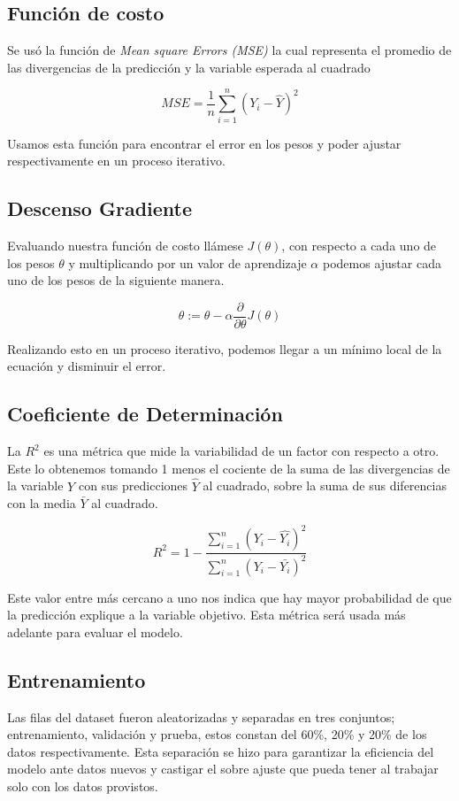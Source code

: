 \documentclass[twocolumn]{article}
\begin{document}
\subsection{Función de costo}
Se usó la función de \textit{Mean square Errors (MSE)} la cual representa el promedio
de las divergencias de la predicción y la variable esperada al cuadrado

\begin{equation}
  MSE = \frac{1}{n}\sum_{i = 1}^n (Y_i - \hat{Y})^2
\end{equation}

Usamos esta función para encontrar el error en los pesos y poder ajustar respectivamente
en un proceso iterativo.

\subsection{Descenso Gradiente}
Evaluando nuestra función de costo llámese \(J(\theta)\), con respecto a cada uno 
de los pesos \(\theta\) y multiplicando por un valor de aprendizaje \(\alpha\) 
podemos ajustar cada uno de los pesos de la siguiente manera.

\begin{equation}
  \theta := \theta - \alpha \frac{\partial}{\partial\theta}J(\theta)
\end{equation}

Realizando esto en un proceso iterativo, podemos llegar a un mínimo local de la 
ecuación y disminuir el error.

\subsection{Coeficiente de Determinación}
La \(R^2\) es una métrica que mide la variabilidad de un factor con respecto a otro.
Este lo obtenemos tomando 1 menos el cociente de la suma de las divergencias de 
la variable \(Y\) con sus predicciones \(\hat{Y}\) al cuadrado, sobre la suma
de sus diferencias con la media \(\bar{Y}\) al cuadrado.

\begin{equation}
  R^2 = 1 - \frac{\sum_{i=1}^{n} (Y_i - \hat{Y_i})^2}{\sum_{i=1}^{n} (Y_i - \bar{Y_i})^2}
\end{equation}

Este valor entre más cercano a uno nos indica que hay mayor probabilidad de que
la predicción explique a la variable objetivo. Esta métrica será usada más adelante 
para evaluar el modelo.

\subsection{Entrenamiento}
Las filas del dataset fueron aleatorizadas y separadas en tres conjuntos; 
entrenamiento, validación y prueba, estos constan del 60\%, 20\% y 20\% de los
datos respectivamente. Esta separación se hizo para garantizar la eficiencia 
del modelo ante datos nuevos y castigar el sobre ajuste que pueda tener al trabajar
solo con los datos provistos.
\end{document}
